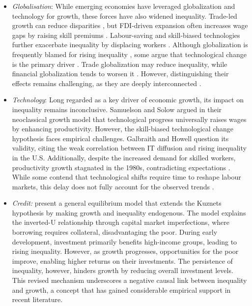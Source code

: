 \documentclass[12pt]{article}
\begin{document}
\begin{itemize}
    \item \textit{Globalisation}: While emerging economies have leveraged globalization and technology for growth, these forces have also widened inequality. Trade-led growth can reduce disparities \parencite{jaumotte2013rising}, but FDI-driven expansion often increases wage gaps by raising skill premiums \parencite{Eichengreen2021}. Labour-saving and skill-biased technologies further exacerbate inequality by displacing workers \parencite{acemoglu2019automation}. Although globalization is frequently blamed for rising inequality \parencite{ravallion2018inequality}, some argue that technological change is the primary driver \parencite{furceri2019robust}. Trade globalization may reduce inequality, while financial globalization tends to worsen it \parencite{asteriou2014globalization}. However, distinguishing their effects remains challenging, as they are deeply interconnected \parencite{davis2018fourth}.
    \item \textit{Technology}: Long regarded as a key driver of economic growth, its impact on inequality remains inconclusive. Samuelson \parencite*{Samuelson1964} and Solow \parencite*{Solow1956, Solow1957} argued in their neoclassical growth model that technological progress universally raises wages by enhancing productivity. However, the skill-biased technological change hypothesis faces empirical challenges. Galbraith \parencite{galbraith1998created} and Howell \parencite*{Howell1996} question its validity, citing the weak correlation between IT diffusion and rising inequality in the U.S. Additionally, despite the increased demand for skilled workers, productivity growth stagnated in the 1980s, contradicting expectations \parencite{Rosenberg1982}. While some contend that technological shifts require time to reshape labour markets, this delay does not fully account for the observed trends \parencite{galbraith2016inequality}.
    \item \textit{Credit:} \textcite{galor1996income} present a general equilibrium model that extends the Kuznets hypothesis by making growth and inequality endogenous. The model explains the inverted-U relationship through capital market imperfections, where borrowing requires collateral, disadvantaging the poor. During early development, investment primarily benefits high-income groups, leading to rising inequality. However, as growth progresses, opportunities for the poor improve, enabling higher returns on their investments. The persistence of inequality, however, hinders growth by reducing overall investment levels. This revised mechanism underscores a negative causal link between inequality and growth, a concept that has gained considerable empirical support in recent literature.

\end{itemize}
\end{document}
